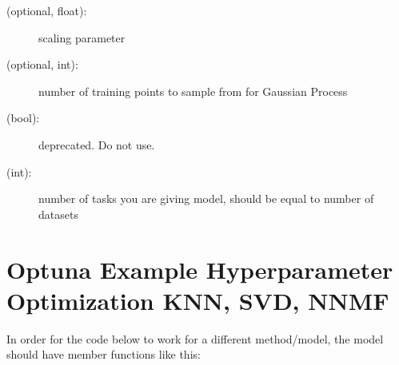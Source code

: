 \documentclass[letterpaper,10pt,english,openany,oneside]{sphinxmanual}
\begin{document}
\begin{fulllineitems}
\begin{description}
\begin{description}
\item[{ (optional, float):}] \leavevmode
scaling parameter

\item[{ (optional, int):}] \leavevmode
number of training points to sample from for Gaussian Process

\item[{ (bool):}] \leavevmode
deprecated. Do not use.

\item[{ (int):}] \leavevmode
number of tasks you are giving model, should be equal to number of datasets

\end{description}

\end{description}

\end{fulllineitems}



\chapter{Optuna Example Hyperparameter Optimization KNN, SVD, NNMF}
\label{\detokenize{Optuna_Walkthrough:Optuna-Example-Hyperparameter-Optimization-KNN,-SVD,-NNMF}}\label{\detokenize{Optuna_Walkthrough::doc}}
In order for the code below to work for a different method/model, the model should have member functions like this:
\end{document}
